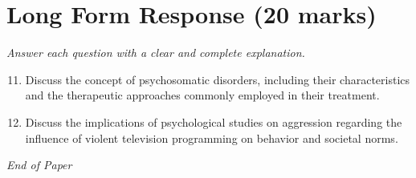 \documentclass[12pt]{article}
\begin{document}
\section*{Long Form Response (20 marks)}
\textit{Answer each question with a clear and complete explanation.}
\begin{enumerate}[label=\arabic*.]
\setcounter{enumi}{10}
\item Discuss the concept of psychosomatic disorders, including their characteristics and the therapeutic approaches commonly employed in their treatment.
\item Discuss the implications of psychological studies on aggression regarding the influence of violent television programming on behavior and societal norms.
\end{enumerate}

\vfill
\noindent\textit{End of Paper}
\end{document}
